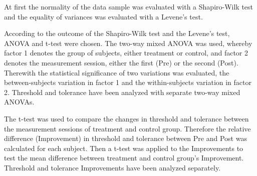 At first the normality of the data sample was evaluated with a Shapiro-Wilk test and the equality of variances was evaluated with a Levene's test. 

According to the outcome of the Shapiro-Wilk test and the Levene’s test, ANOVA and t-test were chosen. The two-way mixed ANOVA was used, whereby factor 1 denotes the group of subjects, either treatment or control, and factor 2 denotes the measurement session, either the first (Pre) or the second (Post). Therewith the statistical significance of two variations was evaluated, the between-subjects variation in factor 1 and the within-subjects variation in factor 2. \cite{Mooi2018} Threshold and tolerance have been analyzed with separate two-way mixed ANOVAs.

The t-test was used to compare the changes in threshold and tolerance between the measurement sessions of treatment and control group. Therefore the relative difference (Improvement) in threshold and tolerance between Pre and Post was calculated for each subject. Then a t-test was applied to the Improvements to test the mean difference between treatment and control group’s Improvement. \cite{Mooi2018} Threshold and tolerance Improvements have been analyzed separately.



